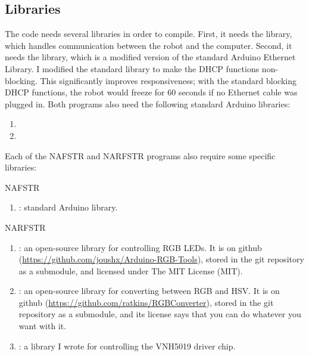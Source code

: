 \documentclass[letterpaper,10pt,english]{sphinxmanual}
\begin{document}
\subsection{Libraries}
\label{ProgramDevelopment:libraries}
The code needs several libraries in order to compile. First, it needs the  library, which handles communication between the robot and the computer. Second, it needs the  library, which is a modified version of the standard Arduino Ethernet Library. I modified the standard library to make the DHCP functions non-blocking. This significantly improves responsiveness; with the standard blocking DHCP functions, the robot would freeze for 60 seconds if no Ethernet cable was plugged in. Both programs also need the following standard Arduino libraries:
\begin{enumerate}
\item {} 

\item {} 

\end{enumerate}

Each of the NAFSTR and NARFSTR programs also require some specific libraries:

NAFSTR
\begin{enumerate}
\item {} 
: standard Arduino library.

\end{enumerate}

NARFSTR
\begin{enumerate}
\item {} 
: an open-source library for controlling RGB LEDs. It is on github (\href{https://github.com/joushx/Arduino-RGB-Tools}{https://github.com/joushx/Arduino-RGB-Tools}), stored in the git repository as a submodule, and licensed under The MIT License (MIT).

\item {} 
:  an open-source library for converting between RGB and HSV. It is on github (\href{https://github.com/ratkins/RGBConverter}{https://github.com/ratkins/RGBConverter}), stored in the git repository as a submodule, and its license says that you can do whatever you want with it.

\item {} 
: a library I wrote for controlling the VNH5019 driver chip.

\end{enumerate}
\end{document}

